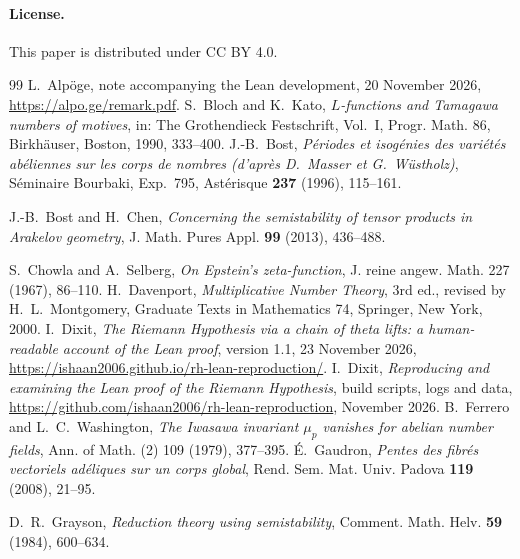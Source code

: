 \documentclass[11pt]{amsart}
\theoremstyle{plain}
\theoremstyle{definition}
\numberwithin{equation}{section}
\begin{document}
\paragraph{License.} This paper is distributed under CC BY 4.0.
\begin{thebibliography}{99}
 L.~Alp\"oge, note accompanying the Lean development, 20 November 2026,
  \url{https://alpo.ge/remark.pdf}.
 S.~Bloch and K.~Kato, \emph{$L$-functions and Tamagawa numbers of motives}, in:
  The Grothendieck Festschrift, Vol.~I, Progr. Math. 86, Birkh\"auser, Boston, 1990, 333--400.
 J.-B.~Bost, \emph{P\'eriodes et isog\'enies des vari\'et\'es ab\'eliennes sur les corps de nombres (d'apr\`es D.~Masser et G.~W\"ustholz)}, S\'eminaire Bourbaki, Exp.~795, Ast\'erisque \textbf{237} (1996), 115--161.

 J.-B.~Bost and H.~Chen, \emph{Concerning the semistability of tensor products in Arakelov geometry}, J. Math. Pures Appl. \textbf{99} (2013), 436--488.

 S.~Chowla and A.~Selberg, \emph{On Epstein's zeta-function}, J. reine angew.
  Math. 227 (1967), 86--110.
 H.~Davenport, \emph{Multiplicative Number Theory}, 3rd ed., revised by
  H.~L.~Montgomery, Graduate Texts in Mathematics 74, Springer, New York, 2000.
 I.~Dixit, \emph{The Riemann Hypothesis via a chain of theta lifts: a
  human-readable account of the Lean proof}, version 1.1, 23 November 2026,
  \url{https://ishaan2006.github.io/rh-lean-reproduction/}.
 I.~Dixit, \emph{Reproducing and examining the Lean proof of the Riemann
  Hypothesis}, build scripts, logs and data, \url{https://github.com/ishaan2006/rh-lean-reproduction},
  November 2026.
 B.~Ferrero and L.~C.~Washington, \emph{The Iwasawa invariant $\mu_p$
  vanishes for abelian number fields}, Ann. of Math. (2) 109 (1979), 377--395.
 \'E.~Gaudron, \emph{Pentes des fibr\'es vectoriels ad\'eliques sur un corps global}, Rend. Sem. Mat. Univ. Padova \textbf{119} (2008), 21--95.

 D.~R.~Grayson, \emph{Reduction theory using semistability}, Comment. Math. Helv. \textbf{59} (1984), 600--634.


\end{thebibliography}
\end{document}
